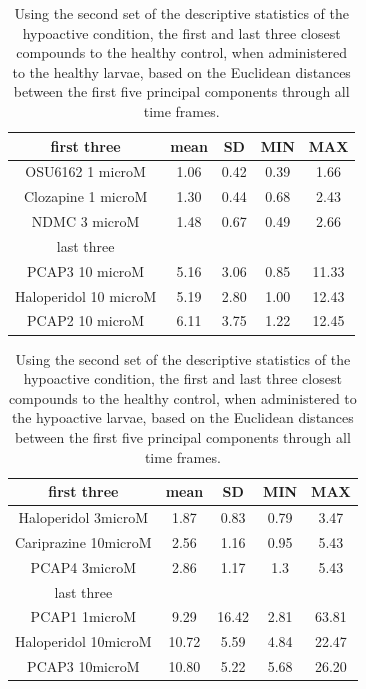 \documentclass[a4paper,12pt]{article}
\begin{document}
\begin{table}[h!]\tiny
\centering
\begin{tabular}{|c|c|c|c|c|}
\hline
first three          & mean & SD   & MIN  & MAX   \\ \hline
OSU6162 1 microM       & 1.06 & 0.42 & 0.39 & 1.66  \\ \hline
Clozapine 1 microM     & 1.30  & 0.44 & 0.68 & 2.43  \\ \hline
NDMC 3 microM          & 1.48 & 0.67 & 0.49 & 2.66  \\ \hline
last three           & \multicolumn{4}{c|}{}      \\ \hline
PCAP3 10 microM      & 5.16 & 3.06 & 0.85 & 11.33 \\ \hline
Haloperidol 10 microM  & 5.19 & 2.80  & 1.00    & 12.43 \\ \hline
PCAP2 10 microM        & 6.11 & 3.75 & 1.22 & 12.45 \\ \hline
\end{tabular}
\caption{Using the second set of the descriptive statistics of the hypoactive condition, the first and last three closest compounds to the healthy control, when administered to the healthy larvae, based on the Euclidean distances between the first five principal components through all time frames.}
\end{table}
\begin{table}[h!]\tiny
\centering
\begin{tabular}{|c|c|c|c|c|}
\hline
first three          & mean & SD    & MIN  & MAX   \\ \hline
Haloperidol 3microM   & 1.87  & 0.83  & 0.79 & 3.47  \\ \hline
Cariprazine 10microM  & 2.56  & 1.16  & 0.95 & 5.43  \\ \hline
PCAP4 3microM       & 2.86  & 1.17  & 1.3  & 5.43  \\ \hline
last three           & \multicolumn{4}{c|}{}       \\ \hline
PCAP1 1microM         & 9.29  & 16.42 & 2.81 & 63.81 \\ \hline
Haloperidol 10microM  & 10.72 & 5.59  & 4.84 & 22.47 \\ \hline
PCAP3 10microM      & 10.80  & 5.22  & 5.68 & 26.20  \\ \hline
\end{tabular}
\caption{Using the second set of the descriptive statistics of the hypoactive condition, the first and last three closest compounds to the healthy control, when administered to the hypoactive larvae, based on the Euclidean distances between the first five principal components through all time frames.}
\end{table}
\end{document}
